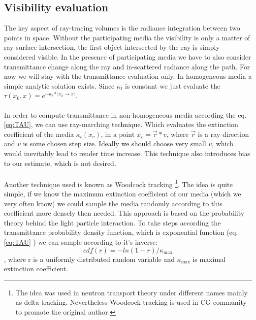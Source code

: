 
\subsection{Visibility evaluation}
The key aspect of ray-tracing volumes is the radiance integration between two points in space. Without the participating media the visibility is only a matter of ray surface intersection, the first object intersected by the ray is simply considered visible. In the presence of participating media we have to also consider transmittance change along the ray and in-scattered radiance along the path. For now we will stay with the transmittance evaluation only. In homogeneous media a simple analytic solution exists. Since $\kappa_t$ is constant we just evaluate the $  \tau(x_{0},x)=e^{-\kappa_t*\left | x_{0}\rightarrow x \right |}$.
\\
\\
In order to compute transmittance in non-homogeneous media according the eq. \ref{eq:TAU}, we can use ray-marching technique. Which evaluates the extinction coefficient of the media $\kappa_t(x_{v})\text{, in a point }x_{v}=\vec{r}*v$, where $\vec{r}$ is a ray direction and $v$ is some chosen step size. Ideally we should choose very small $v$, which would inevitably lead to render time increase. This technique also introduces bias to our estimate, which is not desired.
\\
\\
Another technique used is known as Woodcock tracking \footnote{ The idea was used in neutron transport theory under different names mainly as delta tracking. Nevertheless Woodcock tracking is used in CG community to promote the original author.}. The idea is quite simple, if we know the maximum extinction coefficient of our media (which we very often know) we could sample the media randomly according to this coefficient more densely then needed. This approach is based on the probability theory behind the light particle interaction. To take steps according the transmittance probability density function, which is exponential function (eq. \ref{eq:TAU} ) we can sample according to it's inverse:
\begin{equation}
cdf(r)=-ln(1-r)/\kappa_\text{max}
\end{equation}
, where r is a uniformly distributed random variable and $\kappa_\text{max}$ is maximal extinction coefficient.

